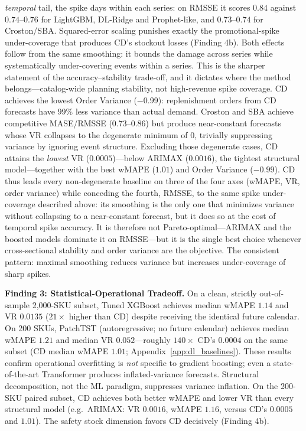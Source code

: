 \documentclass[10pt]{article} %
\theoremstyle{plain}
\theoremstyle{definition}
\begin{document}
\emph{temporal} tail, the spike days within each series: on RMSSE it scores $0.84$ against $0.74$--$0.76$ for LightGBM, DL-Ridge and Prophet-like, and $0.73$--$0.74$ for Croston/SBA. Squared-error scaling punishes exactly the promotional-spike under-coverage that produces CD's stockout losses (Finding 4b). Both effects follow from the same smoothing: it bounds the damage across series while systematically under-covering events within a series. This is the sharper statement of the accuracy--stability trade-off, and it dictates where the method belongs---catalog-wide planning stability, not high-revenue spike coverage. CD achieves the lowest Order Variance ($-$0.99): replenishment orders from CD forecasts have 99\% less variance than actual demand. Croston and SBA achieve competitive MASE/RMSSE (0.73--0.86) but produce near-constant forecasts whose VR collapses to the degenerate minimum of $0$, trivially suppressing variance by ignoring event structure. Excluding those degenerate cases, CD attains the \emph{lowest} VR ($0.0005$)---below ARIMAX ($0.0016$), the tightest structural model---together with the best wMAPE ($1.01$) and Order Variance ($-0.99$). CD thus leads every non-degenerate baseline on three of the four axes (wMAPE, VR, order variance) while conceding the fourth, RMSSE, to the same spike under-coverage described above: its smoothing is the only one that minimizes variance without collapsing to a near-constant forecast, but it does so at the cost of temporal spike accuracy. It is therefore not Pareto-optimal---ARIMAX and the boosted models dominate it on RMSSE---but it is the single best choice whenever cross-sectional stability and order variance are the objective. The consistent pattern: maximal smoothing reduces variance but increases under-coverage of sharp spikes.

\textbf{Finding 3: Statistical-Operational Tradeoff.} On a clean, strictly out-of-sample 2,000-SKU subset, Tuned XGBoost achieves median wMAPE $1.14$ and VR $0.0135$ ($21\times$ higher than CD) despite receiving the identical future calendar. On 200 SKUs, PatchTST (autoregressive; no future calendar) achieves median wMAPE $1.21$ and median VR $0.052$---roughly $140\times$ CD's $0.0004$ on the same subset (CD median wMAPE $1.01$; \allowbreak Appendix~\ref{app:dl_baselines}). These results confirm operational overfitting is \emph{not} specific to gradient boosting; even a state-of-the-art Transformer produces inflated-variance forecasts. Structural decomposition, not the ML paradigm, suppresses variance inflation. On the 200-SKU paired subset, CD achieves both better wMAPE and lower VR than every structural model (e.g.\ ARIMAX: VR $0.0016$, wMAPE $1.16$, versus CD's $0.0005$ and $1.01$). The safety stock dimension favors CD decisively (Finding 4b).
\end{document}
